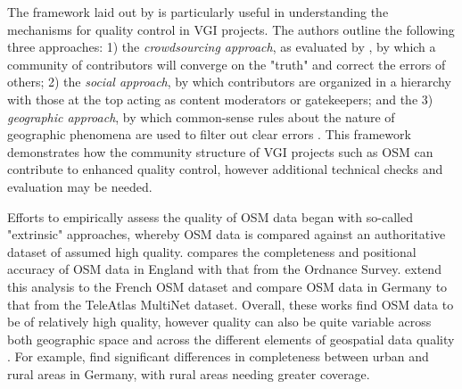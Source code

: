 The framework laid out by \textcite{goodchild_assuring_2012} is particularly useful in understanding the mechanisms for quality control in VGI projects. The authors outline the following three approaches: 1) the \textit{crowdsourcing approach}, as evaluated by \textcite{haklay_how_2010-1}, by which a community of contributors will converge on the "truth" and correct the errors of others; 2) the \textit{social approach}, by which contributors are organized in a hierarchy with those at the top acting as content moderators or gatekeepers; and the 3) \textit{geographic approach}, by which common-sense rules about the nature of geographic phenomena are used to filter out clear errors \parencite{goodchild_assuring_2012}. This framework demonstrates how the community structure of VGI projects such as OSM can contribute to enhanced quality control, however additional technical checks and evaluation may be needed.

Efforts to empirically assess the quality of OSM data began with so-called "extrinsic" approaches, whereby OSM data is compared against an authoritative dataset of assumed high quality. \textcite{haklay_how_2010} compares the completeness and positional accuracy of OSM data in England with that from the Ordnance Survey. \textcite{girres_quality_2010} extend this analysis to the French OSM dataset and \textcite{zielstra_comparative_2010} compare OSM data in Germany to that from the TeleAtlas MultiNet dataset. Overall, these works find OSM data to be of relatively high quality, however quality can also be quite variable across both geographic space and across the different elements of geospatial data quality \parencite{girres_quality_2010, haklay_how_2010}. For example, \textcite{zielstra_comparative_2010} find significant differences in completeness between urban and rural areas in Germany, with rural areas needing greater coverage.

